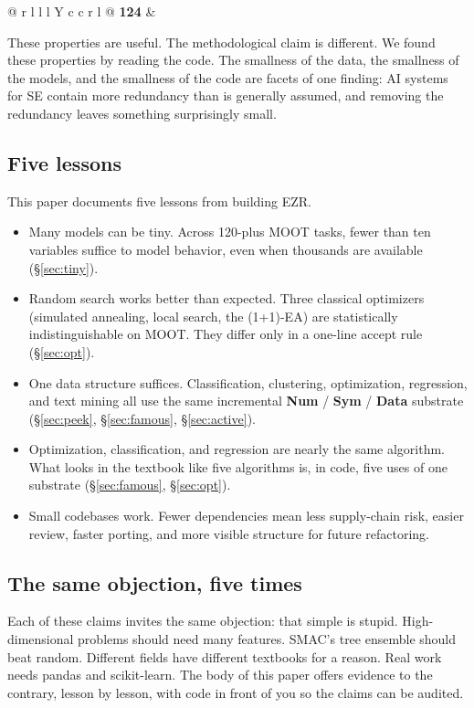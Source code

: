 \documentclass[AMA,STIX2COL]{WileyNJDv5}
\newcommand{\IT}{{\sffamily EZR}}
\newcommand{\cls}[1]{%
  \setlength{\fboxsep}{1.5pt}%
  \colorbox{clsbg}{\sffamily\bfseries{#1}}%
}
\begin{document}
\begin{table}[!t]
{\begin{tabularx}{\textwidth}{@{} r l l l Y c c r l @{}}
\midrule
\textbf{124 } &   
\end{tabularx}
}
\end{table}


These properties are useful. The methodological claim is
different. We found these properties by reading the code. The
smallness of the data, the smallness of the models, and the
smallness of the code are facets of one finding: AI systems for
SE contain more redundancy than is generally assumed, and
removing the redundancy leaves something surprisingly small.

\subsection*{Five lessons}

This paper documents five lessons from building \IT{}.

\begin{itemize}
\item Many models can be tiny. Across 120-plus MOOT tasks,
fewer than ten variables suffice to model behavior, even when
thousands are available (\S\ref{sec:tiny}).
\item Random search works better than expected. Three classical
optimizers (simulated annealing, local search, the (1+1)-EA) are
statistically indistinguishable on MOOT. They differ only in a
one-line accept rule (\S\ref{sec:opt}).
\item One data structure suffices. Classification, clustering,
optimization, regression, and text mining all use the same
incremental \cls{Num}/\cls{Sym}/\cls{Data} substrate
(\S\ref{sec:peek}, \S\ref{sec:famous}, \S\ref{sec:active}).
\item Optimization, classification, and regression are nearly the
same algorithm. What looks in the textbook like five algorithms
is, in code, five uses of one substrate (\S\ref{sec:famous},
\S\ref{sec:opt}).
\item Small codebases work. Fewer dependencies mean less
supply-chain risk, easier review, faster porting, and more
visible structure for future refactoring.
\end{itemize}

\subsection*{The same objection, five times}

Each of these claims invites the same objection: that simple is
stupid. High-dimensional problems should need many features.
SMAC's tree ensemble should beat random. Different fields have
different textbooks for a reason. Real work needs pandas and
scikit-learn. The body of this paper offers evidence to the
contrary, lesson by lesson, with code in front of you so the
claims can be audited.
\end{document}
